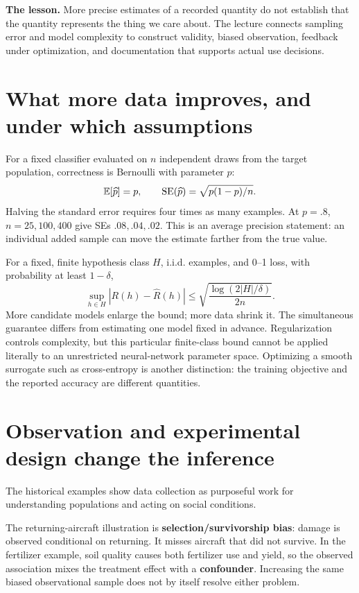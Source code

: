 \documentclass[11pt,letterpaper]{article}
\begin{document}

\textbf{The lesson.} More precise estimates of a recorded quantity do not establish
that the quantity represents the thing we care about. The lecture connects
sampling error and model complexity to construct validity, biased observation,
feedback under optimization, and documentation that supports actual use decisions.

\section*{What more data improves, and under which assumptions}
For a fixed classifier evaluated on $n$ independent draws from the target
population, correctness is Bernoulli with parameter $p$:
\[
\mathbb{E}[\widehat p]=p,\qquad
\mathrm{SE}(\widehat p)=\sqrt{p(1-p)/n}.
\]
Halving the standard error requires four times as many examples. At $p=.8$,
$n=25,100,400$ give SEs $.08,.04,.02$. This is an average precision statement:
an individual added sample can move the estimate farther from the true value.

For a fixed, finite hypothesis class $H$, i.i.d. examples, and 0--1 loss, with
probability at least $1-\delta$,
\[
\sup_{h\in H}|R(h)-\widehat R(h)|
\le\sqrt{\frac{\log(2|H|/\delta)}{2n}}.
\]
More candidate models enlarge the bound; more data shrink it. The simultaneous
guarantee differs from estimating one model fixed in advance. Regularization
controls complexity, but this particular finite-class bound cannot be applied
literally to an unrestricted neural-network parameter space. Optimizing a smooth
surrogate such as cross-entropy is another distinction: the training objective
and the reported accuracy are different quantities.

\section*{Observation and experimental design change the inference}
The historical examples show data collection as purposeful work for understanding
populations and acting on social conditions.

The returning-aircraft illustration is \textbf{selection/survivorship bias}:
damage is observed conditional on returning. It misses aircraft that did not
survive. In the fertilizer example, soil quality causes both fertilizer use and
yield, so the observed association mixes the treatment effect with a
\textbf{confounder}. Increasing the same biased observational sample does not
by itself resolve either problem.
\end{document}
